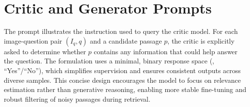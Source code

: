 \section{Critic and Generator Prompts}
\label{supp:prompts}
The prompt illustrates the instruction used to query the critic model. For each image-question pair $(I_q, q)$ and a candidate passage $p$, the critic is explicitly asked to determine whether $p$ contains any information that could help answer the question. The formulation uses a minimal, binary response space (\ie, ``Yes''/``No''), which simplifies supervision and ensures consistent outputs across diverse samples. This concise design encourages the model to focus on relevance estimation rather than generative reasoning, enabling more stable fine-tuning and robust filtering of noisy passages during retrieval.

